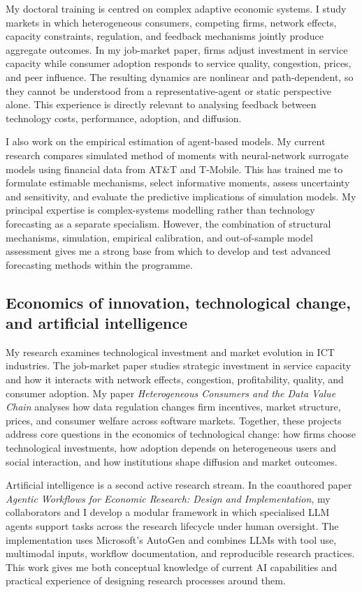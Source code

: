 \documentclass{nfr}
\begin{document}
My doctoral training is centred on complex adaptive economic systems. I study markets in which heterogeneous consumers, competing firms, network effects, capacity constraints, regulation, and feedback mechanisms jointly produce aggregate outcomes. In my job-market paper, firms adjust investment in service capacity while consumer adoption responds to service quality, congestion, prices, and peer influence. The resulting dynamics are nonlinear and path-dependent, so they cannot be understood from a representative-agent or static perspective alone. This experience is directly relevant to analysing feedback between technology costs, performance, adoption, and diffusion.

I also work on the empirical estimation of agent-based models. My current research compares simulated method of moments with neural-network surrogate models using financial data from AT\&T and T-Mobile. This has trained me to formulate estimable mechanisms, select informative moments, assess uncertainty and sensitivity, and evaluate the predictive implications of simulation models. My principal expertise is complex-systems modelling rather than technology forecasting as a separate specialism. However, the combination of structural mechanisms, simulation, empirical calibration, and out-of-sample model assessment gives me a strong base from which to develop and test advanced forecasting methods within the programme.

\subsection*{Economics of innovation, technological change, and artificial intelligence}

My research examines technological investment and market evolution in ICT industries. The job-market paper studies strategic investment in service capacity and how it interacts with network effects, congestion, profitability, quality, and consumer adoption. My paper \textit{Heterogeneous Consumers and the Data Value Chain} analyses how data regulation changes firm incentives, market structure, prices, and consumer welfare across software markets. Together, these projects address core questions in the economics of technological change: how firms choose technological investments, how adoption depends on heterogeneous users and social interaction, and how institutions shape diffusion and market outcomes.

Artificial intelligence is a second active research stream. In the coauthored paper \textit{Agentic Workflows for Economic Research: Design and Implementation}, my collaborators and I develop a modular framework in which specialised LLM agents support tasks across the research lifecycle under human oversight. The implementation uses Microsoft's AutoGen and combines LLMs with tool use, multimodal inputs, workflow documentation, and reproducible research practices. This work gives me both conceptual knowledge of current AI capabilities and practical experience of designing research processes around them.
\end{document}
